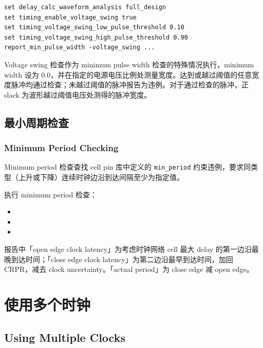 \begin{lstlisting}
set delay_calc_waveform_analysis full_design
set timing_enable_voltage_swing true
set timing_voltage_swing_low_pulse_threshold 0.10
set timing_voltage_swing_high_pulse_threshold 0.90
report_min_pulse_width -voltage_swing ...
\end{lstlisting}


Voltage swing 检查作为 minimum pulse width 检查的特殊情况执行，minimum width 设为 0.0，并在指定的电源电压比例处测量宽度。达到或越过阈值的任意宽度脉冲均通过检查；未越过阈值的脉冲报告为违例。对于通过检查的脉冲，正 slack 为波形越过阈值电压处测得的脉冲宽度。

\subsection{最小周期检查}
\subsubsection*{Minimum Period Checking}

Minimum period 检查查找 cell pin 库中定义的 \texttt{min\_period} 约束违例，要求同类型（上升或下降）连续时钟边沿到达间隔至少为指定值。

执行 minimum period 检查：
\begin{itemize}
  \item {}
  \item {}
  \item {}
\end{itemize}

报告中「open edge clock latency」为考虑时钟网络 cell 最大 delay 的第一边沿最晚到达时间；「close edge clock latency」为第二边沿最早到达时间，加回 CRPR，减去 clock uncertainty。「actual period」为 close edge 减 open edge。


\section{使用多个时钟}
\subsection*{Using Multiple Clocks}

